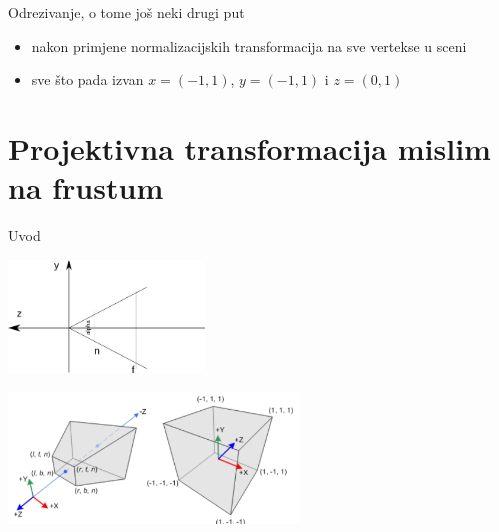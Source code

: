 \documentclass[9pt]{beamer}
\begin{document}
\begin{frame}{Odrezivanje, o tome još neki drugi put}
	\begin{itemize}
		\item nakon primjene normalizacijskih transformacija na sve vertekse u sceni
		\item sve što pada izvan $x =( -1, 1)$, $y =( -1, 1)$ i $z = (0,1)$
	\end{itemize}
\end{frame}

\section{Projektivna transformacija \newline \tiny mislim na frustum}
\begin{frame}{Uvod}
	\begin{center}
		\includegraphics[height=3cm]{slike/p04_06.png}
	\end{center}
	
	\begin{center}
		\includegraphics[height=3.5cm]{slike/perspective_projection.png}
	\end{center}
\end{frame}
\end{document}
